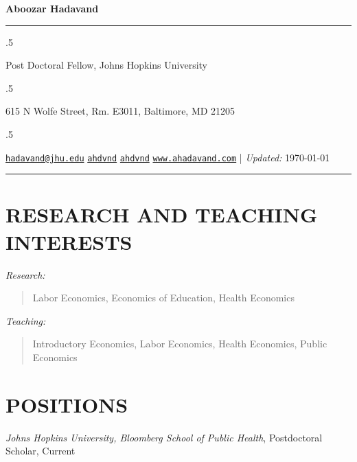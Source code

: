 \documentclass[10pt,]{article}
\begin{document}
\centerline{\huge \bf Aboozar Hadavand}

\vspace{2 mm}

\hrule

\vspace{2 mm}

\moveleft.5\hoffset\centerline{Post Doctoral Fellow, Johns Hopkins University}
\moveleft.5\hoffset\centerline{615 N Wolfe Street, Rm. E3011, Baltimore, MD 21205}
\moveleft.5\hoffset\centerline{ \faEnvelopeO \hspace{1 mm} \href{mailto:}{\tt \href{mailto:hadavand@jhu.edu}{\nolinkurl{hadavand@jhu.edu}}} \hspace{1 mm}  \faGithub \hspace{1 mm} \href{http://github.com/ahdvnd}{\tt ahdvnd} \hspace{1 mm}  \faTwitter \hspace{1 mm} \href{http://twitter.com/ahdvnd}{\tt ahdvnd} \hspace{1 mm}  \faGlobe \hspace{1 mm} \href{http://www.ahadavand.com}{\tt www.ahadavand.com}    | \emph{Updated:} \today}

\vspace{2 mm}

\hrule


\hypertarget{research-and-teaching-interests}{%
\section{RESEARCH AND TEACHING
INTERESTS}\label{research-and-teaching-interests}}

\emph{Research:}

\begin{quote}
Labor Economics, Economics of Education, Health Economics
\end{quote}

\emph{Teaching:}

\begin{quote}
Introductory Economics, Labor Economics, Health Economics, Public
Economics
\end{quote}

\hypertarget{positions}{%
\section{POSITIONS}\label{positions}}

\emph{Johns Hopkins University, Bloomberg School of Public Health},
Postdoctoral Scholar, \hfill Current
\end{document}
